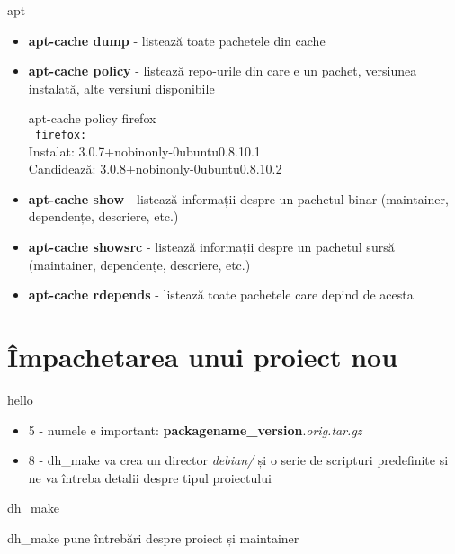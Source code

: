 \documentclass{beamer}
\begin{document}
\begin{frame}{apt}
  \begin{itemize}
  \item \textbf{apt-cache dump} - listează toate pachetele din cache
  \item \textbf{apt-cache policy} - listează repo-urile din care e un pachet, versiunea instalată, alte versiuni disponibile
    \begin{beamerboxesrounded}[lower=block body,shadow=true,width=8cm]{}
      apt-cache policy firefox \\
      \texttt{   firefox:}\\
      Instalat: 3.0.7+nobinonly-0ubuntu0.8.10.1 \\
      Candidează: 3.0.8+nobinonly-0ubuntu0.8.10.2
    \end{beamerboxesrounded}
  \item \textbf{apt-cache show} - listează informații despre un pachetul binar (maintainer, dependențe, descriere, etc.)
  \item \textbf{apt-cache showsrc} - listează informații despre un pachetul sursă (maintainer, dependențe, descriere, etc.)
  \item \textbf{apt-cache rdepends} - listează toate pachetele care depind de acesta
  \end{itemize}
\end{frame}


\section{Împachetarea unui proiect nou}
\frame{\tableofcontents[currentsection]}

\begin{frame}{hello}
  \begin{itemize}
    \begin{beamerboxesrounded}[lower=block body,shadow=true]{1\_wget.sh - luăm sursele proiectului hello}
      \small 
    \end{beamerboxesrounded}
  \item 5 - numele e important: \textbf{packagename\_version}.\textit{orig.tar.gz}
  \item 8 - dh\_make va crea un director \textit{debian/} și o serie 
    de scripturi predefinite și ne va întreba detalii despre tipul proiectului
  \end{itemize}
\end{frame}

\begin{frame}{dh\_make}
    \begin{beamerboxesrounded}[lower=block body,shadow=true]{dh\_make pune întrebări despre proiect și maintainer}
      \small 
    \end{beamerboxesrounded}
\end{frame}
\end{document}
